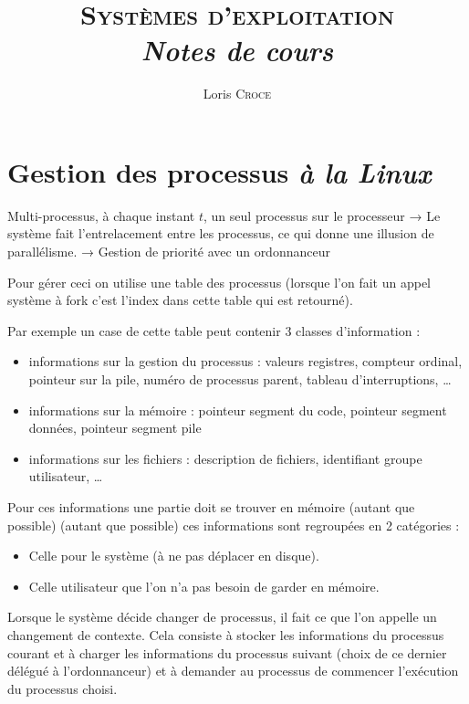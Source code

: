 \documentclass[11pt, a4paper]{article}
\author{Loris \textsc{Croce}}
\title{\textsc{Systèmes d'exploitation}\\ \emph{Notes de cours}}
\date{}
\begin{document}
\maketitle
\tableofcontents

\section[Gestion des processus. à la Linux]{Gestion des processus {\normalfont\emph{à la Linux}}}

Multi-processus, à chaque instant $t$, un seul processus sur le processeur → Le système fait l'entrelacement entre les processus, ce qui donne une illusion de parallélisme. → Gestion de priorité avec un ordonnanceur

Pour gérer ceci on utilise une table des processus (lorsque l'on fait un appel système à fork c'est l'index dans cette table qui est retourné).

Par exemple un case de cette table peut contenir 3 classes d'information :

\begin{itemize}
\item informations sur la gestion du processus : valeurs registres, compteur ordinal, pointeur sur la pile, numéro de processus parent, tableau d'interruptions, \dots
\item informations sur la mémoire : pointeur segment du code, pointeur segment données, pointeur segment pile
\item informations sur les fichiers : description de fichiers, identifiant groupe utilisateur, \dots
\end{itemize}

Pour ces informations une partie doit se trouver en mémoire (autant que possible)
(autant que possible) ces informations sont regroupées en 2 catégories : 

\begin{itemize}
\item Celle pour le système (à ne pas déplacer en disque).
\item Celle utilisateur que l'on n'a pas besoin de garder en mémoire.
\end{itemize}

Lorsque le système décide changer de processus, il fait ce que l'on appelle un changement de contexte. Cela consiste à stocker les informations du processus courant et à charger les informations du processus suivant (choix de ce dernier délégué à l'ordonnanceur) et à demander au processus de commencer l'exécution du processus choisi.
\end{document}
